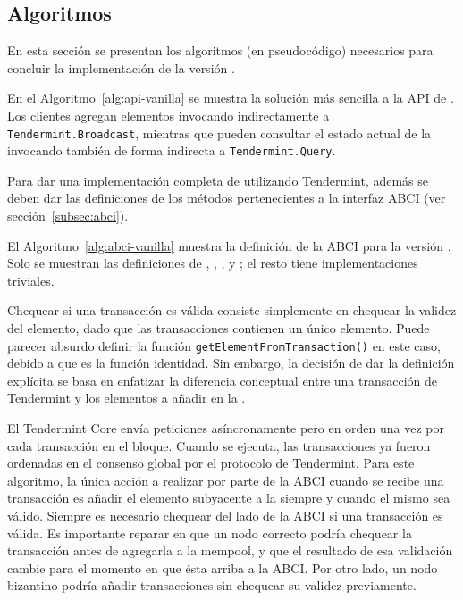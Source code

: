 
\subsection{Algoritmos}

En esta sección se presentan los algoritmos (en pseudocódigo) necesarios para concluir
la implementación de la versión \vanilla.
%


En el Algoritmo~\ref{alg:api-vanilla} se muestra la solución más sencilla a la API
de \setchain.
%
Los clientes agregan elementos invocando indirectamente a
\texttt{Tendermint.Broadcast}, mientras que pueden consultar el estado actual de
la \setchain invocando también de forma indirecta a \texttt{Tendermint.Query}.
%

Para dar una implementación completa de \setchain utilizando Tendermint, además se
deben dar las definiciones de los métodos pertenecientes a la interfaz ABCI
(ver sección~\ref{subsec:abci}). 
%


El Algoritmo~\ref{alg:abci-vanilla} muestra la definición de la ABCI para la versión
\vanilla.
%
Solo se muestran las definiciones de \CheckTx, \DeliverTx, \EndBlock, y \Query;
el resto tiene implementaciones triviales.

Chequear si una transacción es válida consiste simplemente en chequear
la validez del elemento, dado que las transacciones contienen un único elemento.
%
Puede parecer absurdo definir la función \texttt{getElementFromTransaction()}
en este caso, debido a que es la función identidad. Sin embargo, la decisión de dar
la definición explícita se basa en enfatizar la diferencia conceptual entre una
transacción de Tendermint y los elementos a añadir en la \setchain.
%

El Tendermint Core envía peticiones \DeliverTx asíncronamente pero en orden
una vez por cada transacción en el bloque.
%
Cuando \DeliverTx se ejecuta, las transacciones ya fueron ordenadas en el consenso global por el protocolo
de Tendermint.
%
Para este algoritmo, la única acción a realizar por parte de la ABCI cuando se recibe una
transacción es añadir el elemento subyacente a la \setchain siempre y cuando el mismo
sea válido.
%
Siempre es necesario chequear del lado de la ABCI si una transacción es válida.
%
Es importante reparar en que un nodo correcto podría chequear la transacción antes de agregarla a la
mempool,
y que el resultado de esa validación cambie para el momento en que ésta arriba a la
ABCI.
%
Por otro lado, un nodo bizantino podría añadir transacciones sin chequear
su validez previamente.
%

